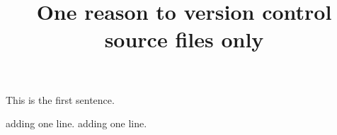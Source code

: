 \documentclass{article}
\title{One reason to version control source files only}
\begin{document}
\maketitle

This is the first sentence.

adding one line.
adding one line.
\end{document}
